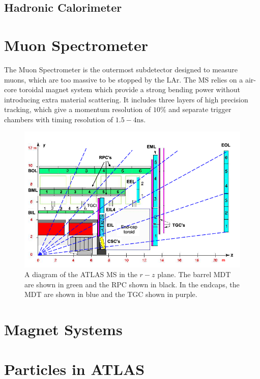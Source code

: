 \subsection{Hadronic Calorimeter}


\section{Muon Spectrometer}
The Muon Spectrometer is the outermost subdetector designed to measure muons, which are too massive to be stopped by the \ac{LAr}. The \ac{MS} relies on a air-core toroidal magnet system which provide a strong bending power without introducing extra material scattering. It includes three layers of high precision tracking, which give a momentum resolution of $10\%$ and separate trigger chambers with timing resolution of $1.5-4 \textrm{ns}$. 

\begin{figure}[htbp]
\centering
\includegraphics[width=.8\textwidth]{figures/Detector/atlas-ms.png}
\caption{A diagram of the \ac{ATLAS} \ac{MS} in the $r-z$ plane. The barrel \ac{MDT} are shown in green and the \ac{RPC} shown in black. In the endcaps, the \ac{MDT} are shown in blue and the \ac{TGC} shown in purple. }
\label{fig:atlas-ms}
\end{figure}


\section{Magnet Systems}
\label{sec:magnets}


\section{Particles in ATLAS}

